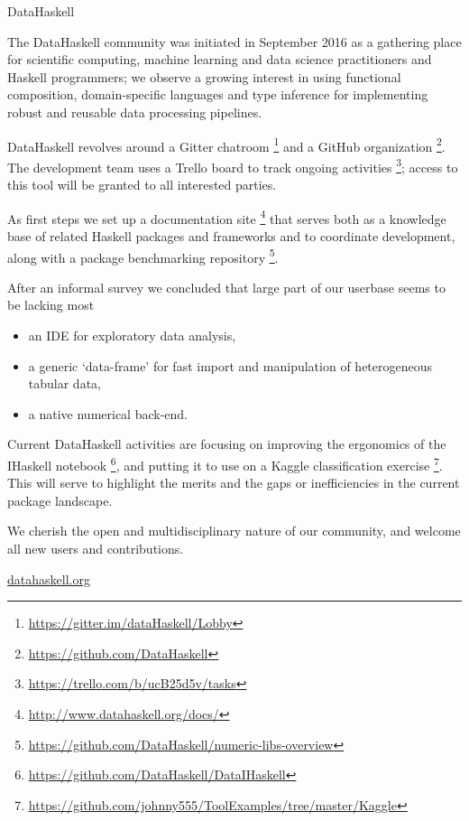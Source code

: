 \documentclass[DIV16,twocolumn,10pt]{scrreprt}
\begin{document}
\begin{hcarentry}{DataHaskell}
\makeheader

The DataHaskell community was initiated in September 2016 as a gathering place for scientific computing, machine learning and data science practitioners and Haskell programmers; we observe a growing interest in using functional composition, domain-specific languages and type inference for implementing robust and reusable data processing pipelines.

DataHaskell revolves around a Gitter chatroom \footnote{\url{https://gitter.im/dataHaskell/Lobby}} and a GitHub organization \footnote{\url{https://github.com/DataHaskell}}. The development team uses a Trello board to track ongoing activities \footnote{\url{https://trello.com/b/ucB25d5v/tasks}}; access to this tool will be granted to all interested parties.

As first steps we set up a documentation site \footnote{\url{http://www.datahaskell.org/docs/}} that serves both as a knowledge base of related Haskell packages and frameworks and to coordinate development, along with a package benchmarking repository \footnote{\url{https://github.com/DataHaskell/numeric-libs-overview}}.

After an informal survey we concluded that large part of our userbase seems to be lacking most
\begin{itemize} 
\item an IDE for exploratory data analysis,
\item a generic `data-frame' for fast import and manipulation of heterogeneous tabular data,
\item a native numerical back-end.
\end{itemize}
Current DataHaskell activities are focusing on improving the ergonomics of the IHaskell notebook \footnote{\url{https://github.com/DataHaskell/DataIHaskell}}, and putting it to use on a Kaggle classification exercise \footnote{\url{https://github.com/johnny555/ToolExamples/tree/master/Kaggle}}. This will serve to highlight the merits and the gaps or inefficiencies in the current package landscape.

We cherish the open and multidisciplinary nature of our community, and welcome all new users and contributions.

\FurtherReading
  \url{datahaskell.org}
\end{hcarentry}
\end{document}
